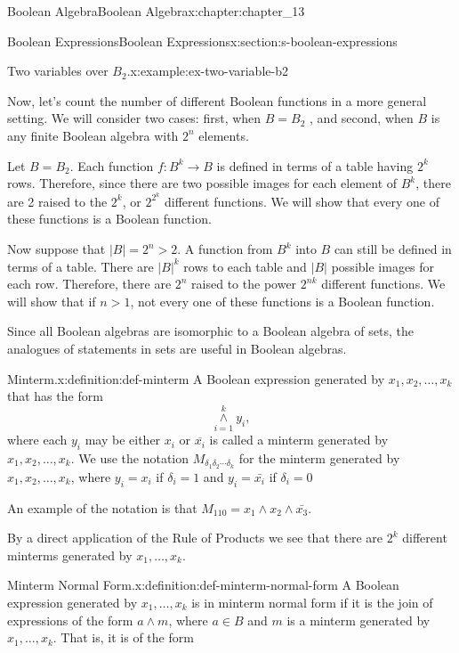 \documentclass[oneside,10pt,]{book}
\numberwithin{equation}{section}
\begin{document}
\begin{chapterptx}{Boolean Algebra}{}{Boolean Algebra}{}{}{x:chapter:chapter_13}
\begin{sectionptx}{Boolean Expressions}{}{Boolean Expressions}{}{}{x:section:s-boolean-expressions}
\begin{example}{Two variables over \(B_2\).}{x:example:ex-two-variable-b2}
\end{example}
Now, let's count the number of different Boolean functions in a more general setting. We will consider two cases: first, when \(B=B_2\) , and second, when \(B\) is any finite Boolean algebra with \(2^n\) elements.%
\par
Let \(B=B_2\). Each function \(f:B^k\to B\) is defined in terms of a table having \(2^k\) rows. Therefore, since there are two possible images for each element of \(B^k\), there are 2 raised to the \(2^k\), or  \(2^{2^k}\) different functions.  We will show that every one of these functions is a Boolean function.%
\par
Now suppose that \(\lvert B\rvert =2^n>2\). A function from \(B^k\) into \(B\) can still be defined in terms of a table. There are \(\lvert B\rvert^k\) rows to each table and \(\lvert B\rvert\) possible images for each row. Therefore, there are \(2^n\) raised to the power \(2^{nk}\) different functions. We will show that if \(n>1\), not every one of these functions is a Boolean function.%
\par
Since all Boolean algebras are isomorphic to a Boolean algebra of sets, the analogues of statements in sets are useful in Boolean algebras.%
\begin{definition}{Minterm.}{x:definition:def-minterm}%
%
\label{g:notation:idm546613401968}%
A Boolean expression generated by  \(x_1, x_2, \ldots , x_k\) that has the form%
\begin{equation*}
\underset{i=1}{\overset{k}{\land }}y_i,
\end{equation*}
where each \(y_i\) may be either  \(x_i\) or \(\overline{x_i}\) is  called a minterm generated by \(x_1, x_2,
\ldots , x_k\). We use the notation \(M_{\delta_1 \delta_2 \cdots \delta_k}\) for the minterm generated by \(x_1, x_2, \ldots , x_k\), where  \(y_i=x_i\) if \(\delta_i = 1\) and \(y_i=\bar{x_i}\) if \(\delta_i = 0\)%
\end{definition}
An example of the notation is that  \(M_{110} = x_1 \land x_2 \land \bar{x_3}\).%
\par
By a direct application of the  Rule of Products we see that there are \(2^k\) different minterms generated by \(x_1, \ldots , x_k\).%
\begin{definition}{Minterm Normal Form.}{x:definition:def-minterm-normal-form}%
%
A Boolean expression generated by \(x_1, \ldots , x_k\) is in minterm normal form if it is the join of expressions of the form  \(a \land m\), where \(a\in B\)  and \(m\) is a minterm  generated by \(x_1, \ldots , x_k\). That is, it is of the form%

\end{definition}
\end{sectionptx}
\end{chapterptx}
\end{document}
